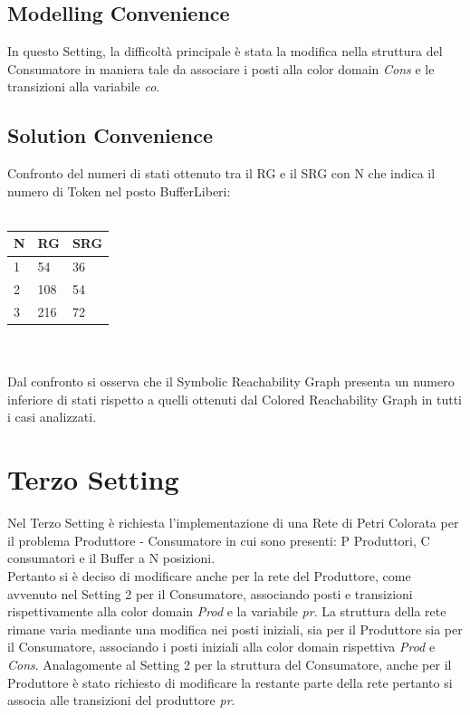 \documentclass{article}
\begin{document}
\subsection{Modelling Convenience}
In questo Setting, la difficoltà principale è stata la modifica nella struttura del Consumatore in maniera tale da associare i posti alla color domain \textit{Cons} e le transizioni alla variabile \textit{co}.
\subsection{Solution Convenience}
Confronto del numeri di stati ottenuto tra il RG e il SRG con N che indica il numero di Token nel posto BufferLiberi:
\\\\
\begin{tabular}{|p{3cm}||p{3cm}|p{3cm}|}
\hline
N & RG & SRG\\
\hline
1&54&36\\
2&108&54\\
3&216&72\\
\hline
\end{tabular}\\\\Dal confronto si osserva che il Symbolic Reachability Graph presenta un numero inferiore di stati rispetto a quelli ottenuti dal Colored Reachability Graph in tutti i casi analizzati. 
\clearpage
\section{Terzo Setting}
Nel Terzo Setting è richiesta l'implementazione di una Rete di Petri Colorata per il problema Produttore - Consumatore in cui sono presenti: P Produttori, C consumatori e il Buffer a N posizioni.
\\Pertanto si è deciso di modificare anche per la rete del Produttore, come avvenuto nel Setting 2 per il Consumatore, associando posti e transizioni rispettivamente alla color domain \textit{Prod} e la variabile \textit{pr}.
La struttura della rete rimane varia mediante una modifica nei posti iniziali, sia per il Produttore sia per il Consumatore, associando i posti iniziali alla color domain rispettiva \textit{Prod} e \textit{Cons}. Analagomente al Setting 2 per la struttura del Consumatore, anche per il Produttore è stato richiesto di modificare la restante parte della rete pertanto si associa alle transizioni del produttore \textit{pr}.
\end{document}
